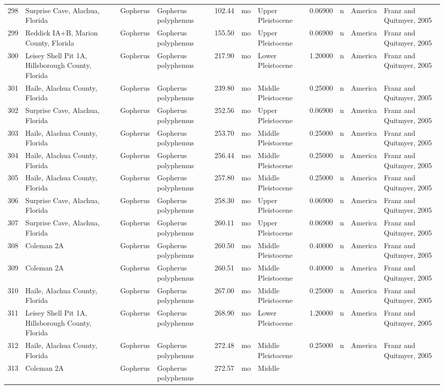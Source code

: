 \documentclass[]{article}
\begin{document}
\begin{longtable}[]{@{}llllrllrlll@{}}
298 & Surprise Cave, Alachua, Florida & Gopherus & Gopherus polyphemus &
102.44 & mo & Upper Pleistocene & 0.06900 & n & America & Franz and
Quitmyer, 2005\tabularnewline
299 & Reddick IA+B, Marion County, Florida & Gopherus & Gopherus
polyphemus & 155.50 & mo & Upper Pleistocene & 0.06900 & n & America &
Franz and Quitmyer, 2005\tabularnewline
300 & Leisey Shell Pit 1A, Hillsborough County, Florida & Gopherus &
Gopherus polyphemus & 217.90 & mo & Lower Pleistocene & 1.20000 & n &
America & Franz and Quitmyer, 2005\tabularnewline
301 & Haile, Alachua County, Florida & Gopherus & Gopherus polyphemus &
239.80 & mo & Middle Pleistocene & 0.25000 & n & America & Franz and
Quitmyer, 2005\tabularnewline
302 & Surprise Cave, Alachua, Florida & Gopherus & Gopherus polyphemus &
252.56 & mo & Upper Pleistocene & 0.06900 & n & America & Franz and
Quitmyer, 2005\tabularnewline
303 & Haile, Alachua County, Florida & Gopherus & Gopherus polyphemus &
253.70 & mo & Middle Pleistocene & 0.25000 & n & America & Franz and
Quitmyer, 2005\tabularnewline
304 & Haile, Alachua County, Florida & Gopherus & Gopherus polyphemus &
256.44 & mo & Middle Pleistocene & 0.25000 & n & America & Franz and
Quitmyer, 2005\tabularnewline
305 & Haile, Alachua County, Florida & Gopherus & Gopherus polyphemus &
257.80 & mo & Middle Pleistocene & 0.25000 & n & America & Franz and
Quitmyer, 2005\tabularnewline
306 & Surprise Cave, Alachua, Florida & Gopherus & Gopherus polyphemus &
258.30 & mo & Upper Pleistocene & 0.06900 & n & America & Franz and
Quitmyer, 2005\tabularnewline
307 & Surprise Cave, Alachua, Florida & Gopherus & Gopherus polyphemus &
260.11 & mo & Upper Pleistocene & 0.06900 & n & America & Franz and
Quitmyer, 2005\tabularnewline
308 & Coleman 2A & Gopherus & Gopherus polyphemus & 260.50 & mo & Middle
Pleistocene & 0.40000 & n & America & Franz and Quitmyer,
2005\tabularnewline
309 & Coleman 2A & Gopherus & Gopherus polyphemus & 260.51 & mo & Middle
Pleistocene & 0.40000 & n & America & Franz and Quitmyer,
2005\tabularnewline
310 & Haile, Alachua County, Florida & Gopherus & Gopherus polyphemus &
267.00 & mo & Middle Pleistocene & 0.25000 & n & America & Franz and
Quitmyer, 2005\tabularnewline
311 & Leisey Shell Pit 1A, Hillsborough County, Florida & Gopherus &
Gopherus polyphemus & 268.90 & mo & Lower Pleistocene & 1.20000 & n &
America & Franz and Quitmyer, 2005\tabularnewline
312 & Haile, Alachua County, Florida & Gopherus & Gopherus polyphemus &
272.48 & mo & Middle Pleistocene & 0.25000 & n & America & Franz and
Quitmyer, 2005\tabularnewline
313 & Coleman 2A & Gopherus & Gopherus polyphemus & 272.57 & mo & Middle

\end{longtable}
\end{document}
